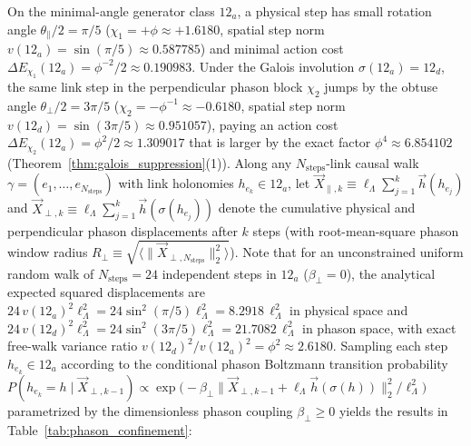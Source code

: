 \documentclass[11pt,a4paper]{article}
\theoremstyle{definition}
\theoremstyle{remark}
\begin{document}
On the minimal-angle generator class $12_a$, a physical step has small rotation angle $\theta_\parallel / 2 = \pi / 5$ ($\chi_1 = +\phi \approx +1.6180$, spatial step norm $v(12_a) = \sin(\pi/5) \approx 0.587785$) and minimal action cost $\Delta E_{\chi_1}(12_a) = \phi^{-2}/2 \approx 0.190983$. Under the Galois involution $\sigma(12_a) = 12_d$, the same link step in the perpendicular phason block $\chi_2$ jumps by the obtuse angle $\theta_\perp / 2 = 3\pi / 5$ ($\chi_2 = -\phi^{-1} \approx -0.6180$, spatial step norm $v(12_d) = \sin(3\pi/5) \approx 0.951057$), paying an action cost $\Delta E_{\chi_2}(12_a) = \phi^2/2 \approx 1.309017$ that is larger by the exact factor $\phi^4 \approx 6.854102$ (Theorem~\ref{thm:galois_suppression}(1)). Along any $N_{\mathrm{steps}}$-link causal walk $\gamma = (e_1, \dots, e_{N_{\mathrm{steps}}})$ with link holonomies $h_{e_k} \in 12_a$, let $\vec{X}_{\parallel,k} \equiv \ell_\Lambda \sum_{j=1}^k \vec{h}(h_{e_j})$ and $\vec{X}_{\perp,k} \equiv \ell_\Lambda \sum_{j=1}^k \vec{h}(\sigma(h_{e_j}))$ denote the cumulative physical and perpendicular phason displacements after $k$ steps (with root-mean-square phason window radius $R_\perp \equiv \sqrt{\langle\|\vec{X}_{\perp,N_{\mathrm{steps}}}\|_2^2\rangle}$). Note that for an unconstrained uniform random walk of $N_{\mathrm{steps}} = 24$ independent steps in $12_a$ ($\beta_\perp = 0$), the analytical expected squared displacements are $24\,v(12_a)^2\ell_\Lambda^2 = 24\sin^2(\pi/5)\ell_\Lambda^2 = 8.2918\,\ell_\Lambda^2$ in physical space and $24\,v(12_d)^2\ell_\Lambda^2 = 24\sin^2(3\pi/5)\ell_\Lambda^2 = 21.7082\,\ell_\Lambda^2$ in phason space, with exact free-walk variance ratio $v(12_d)^2/v(12_a)^2 = \phi^2 \approx 2.6180$. Sampling each step $h_{e_k} \in 12_a$ according to the conditional phason Boltzmann transition probability $P(h_{e_k} = h \mid \vec{X}_{\perp,k-1}) \propto \exp\bigl(-\beta_\perp \|\vec{X}_{\perp,k-1} + \ell_\Lambda\vec{h}(\sigma(h))\|_2^2 / \ell_\Lambda^2\bigr)$ parametrized by the dimensionless phason coupling $\beta_\perp \ge 0$ yields the results in Table~\ref{tab:phason_confinement}:
\end{document}
